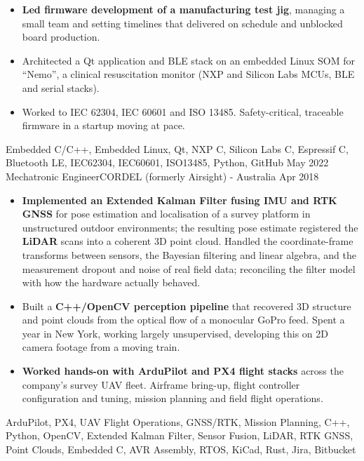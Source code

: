 \begin{experiences}
{\begin{itemize}
			\item \textbf{Led firmware development of a manufacturing test jig}, managing a small team and setting timelines that delivered on schedule and unblocked board production.
			\item Architected a Qt application and BLE stack on an embedded Linux SOM for ``Nemo'', a clinical resuscitation monitor (NXP and Silicon Labs MCUs, BLE and serial stacks).
			\item Worked to IEC 62304, IEC 60601 and ISO 13485. Safety-critical, traceable firmware in a startup moving at pace.
		\end{itemize}
	}
	{Embedded C/C++, Embedded Linux, Qt, NXP \mu C, Silicon Labs \mu C, Espressif \mu C, Bluetooth LE, IEC62304, IEC60601, ISO13485, Python, GitHub}
\emptySeparator
	\experience
		{May 2022}	{Mechatronic Engineer}{CORDEL (formerly Airsight) - Australia}
		{Apr 2018}	{
			\begin{itemize}
				\item \textbf{Implemented an Extended Kalman Filter fusing IMU and RTK GNSS} for pose estimation and localisation of a survey platform in unstructured outdoor environments; the resulting pose estimate registered the \textbf{LiDAR} scans into a coherent 3D point cloud. Handled the coordinate-frame transforms between sensors, the Bayesian filtering and linear algebra, and the measurement dropout and noise of real field data; reconciling the filter model with how the hardware actually behaved.
				\item Built a \textbf{C++/OpenCV perception pipeline} that recovered 3D structure and point clouds from the optical flow of a monocular GoPro feed. Spent a year in New York, working largely unsupervised, developing this on 2D camera footage from a moving train.
				\item \textbf{Worked hands-on with ArduPilot and PX4 flight stacks} across the company's survey UAV fleet. Airframe bring-up, flight controller configuration and tuning, mission planning and field flight operations.
			\end{itemize}
		}
		{ArduPilot, PX4, UAV Flight Operations, GNSS/RTK, Mission Planning, C++, Python, OpenCV, Extended Kalman Filter, Sensor Fusion, LiDAR, RTK GNSS, Point Clouds, Embedded C, AVR Assembly, RTOS, KiCad, Rust, Jira, Bitbucket}
\end{experiences}

